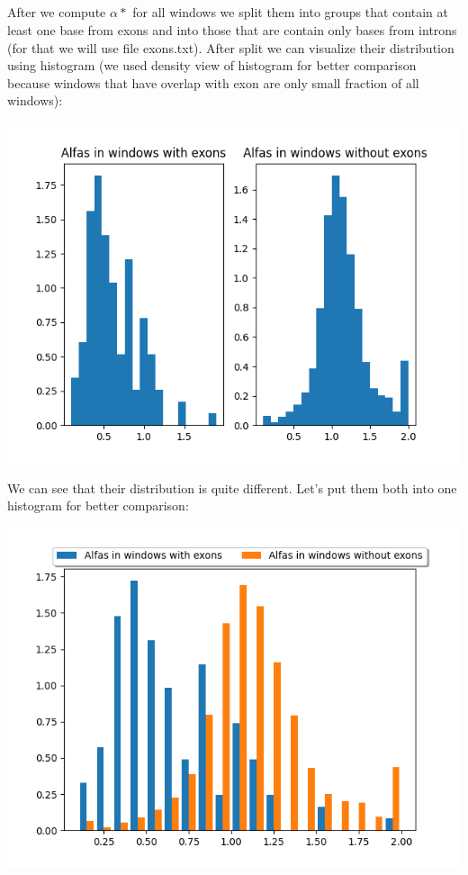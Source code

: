 \documentclass[a4paper]{article}
\begin{document}
	\subsection{}
	
	After we compute $\alpha*$ for all windows we split them into groups that contain at least one base from exons and into those that are contain only bases from introns (for that we will use file exons.txt). After split we can visualize their distribution using histogram (we used density view of histogram for better comparison because windows that have overlap with exon are only small fraction of all windows):
	
	\centerline{\includegraphics[width=1\textwidth]{exons_non_exons_comp.png}} 
	
	We can see that their distribution is quite different. Let's put them both into one histogram for better comparison:
	
	\centerline{\includegraphics[width=1\textwidth]{exons_non_exons_comb.png}} 
	
\end{document}
